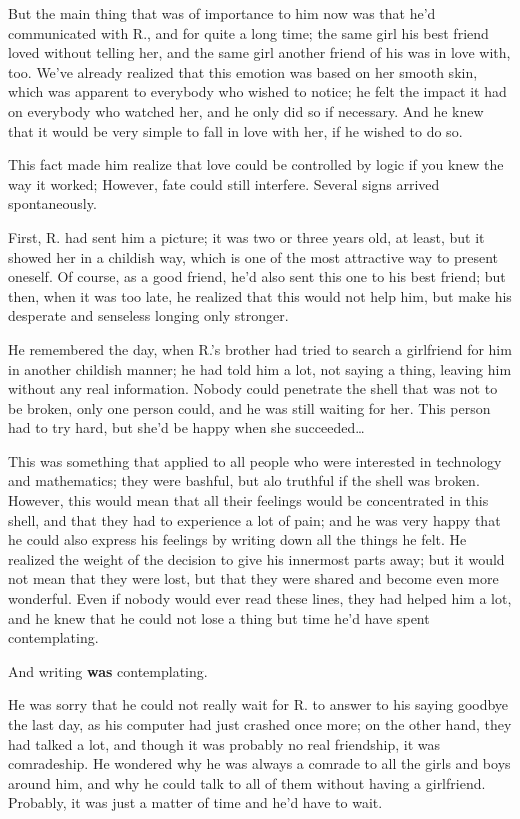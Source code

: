 But the main thing that was of importance to him now was that he'd communicated with R., and for quite a long time; the same girl his best friend loved without telling her, and the same girl another friend of his was in love with, too. We've already realized that this emotion was based on her smooth skin, which was apparent to everybody who wished to notice; he felt the impact it had on everybody who watched her, and he only did so if necessary. And he knew that it would be very simple to fall in love with her, if he wished to do so.

This fact made him realize that love could be controlled by logic if you knew the way it worked; However, fate could still interfere. Several signs arrived spontaneously.

First, R. had sent him a picture; it was two or three years old, at least, but it showed her in a childish way, which is one of the most attractive way to present oneself. Of course, as a good friend, he'd also sent this one to his best friend; but then, when it was too late, he realized that this would not help him, but make his desperate and senseless longing only stronger.

He remembered the day, when R.'s brother had tried to search a girlfriend for him in another childish manner; he had told him a lot, not saying a thing, leaving him without any real information. Nobody could penetrate the shell that was not to be broken, only one person could, and he was still waiting for her. This person had to try hard, but she'd be happy when she succeeded\dots{}

This was something that applied to all people who were interested in technology and mathematics; they were bashful, but alo truthful if the shell was broken. However, this would mean that all their feelings would be concentrated in this shell, and that they had to experience a lot of pain; and he was very happy that he could also express his feelings by writing down all the things he felt. 
He realized the weight of the decision to give his innermost parts away; but it would not mean that they were lost, but that they were shared and become even more wonderful. Even if nobody would ever read these lines, they had helped him a lot, and he knew that he could not lose a thing but time he'd have spent contemplating.

And writing \textbf{was} contemplating.

He was sorry that he could not really wait for R. to answer to his saying goodbye the last day, as his computer had just crashed once more; on the other hand, they had talked a lot, and though it was probably no real friendship, it was comradeship. He wondered why he was always a comrade to all the girls and boys around him, and why he could talk to all of them without having a girlfriend. 
Probably, it was just a matter of time and he'd have to wait.

